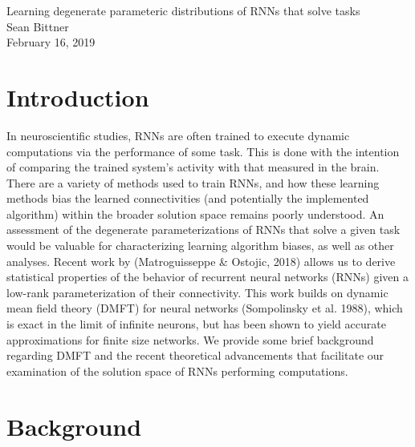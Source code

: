 \documentclass[11pt]{article}
\begin{document}
\medskip                        %

\thispagestyle{plain}
\begin{center}                  %
{\Large Learning degenerate parameteric distributions of RNNs that solve tasks} \\
Sean Bittner \\
February 16, 2019 \\
\end{center}

\section{Introduction}
In neuroscientific studies, RNNs are often trained to execute dynamic computations via the performance of some task.  This is done with the intention of comparing the trained system's activity with that measured in the brain. There are a variety of methods used to train RNNs, and how these learning methods bias the learned connectivities (and potentially the implemented algorithm) within the broader solution space remains poorly understood. An assessment of the degenerate parameterizations of RNNs that solve a given task would be valuable for characterizing learning algorithm biases, as well as other analyses.  Recent work by (Matroguisseppe \& Ostojic, 2018) allows us to derive statistical properties of the behavior of recurrent neural networks (RNNs) given a low-rank parameterization of their connectivity.  This work builds on dynamic mean field theory (DMFT) for neural networks (Sompolinsky et al. 1988), which is exact in the limit of infinite neurons, but has been shown to yield accurate approximations for finite size networks.  We provide some brief background regarding DMFT and the recent theoretical advancements that facilitate our examination of the solution space of RNNs performing computations.

\section{Background}
\end{document}
